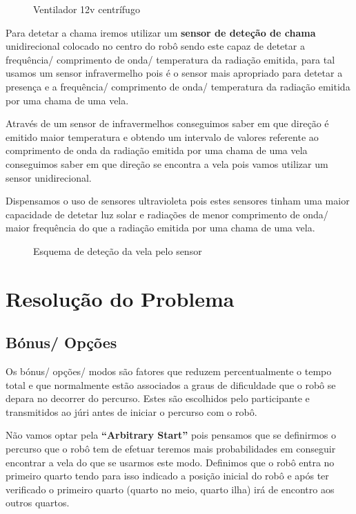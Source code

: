 \documentclass[pdftex,12pt,a4paper]{report}
\begin{document}
\begin{figure}[h]
\centerline{}
\caption{Ventilador 12v centrífugo \cite{Ventilador:28122012}}\label{ventilador}
\end{figure}
	
\clearpage

	Para detetar a chama iremos utilizar um \textbf{sensor de deteção de chama} unidirecional colocado no centro do robô sendo este capaz de detetar a frequência/ comprimento de onda/ temperatura da radiação emitida, para tal usamos um sensor infravermelho pois é o sensor mais apropriado para detetar a presença e a frequência/ comprimento de onda/ temperatura da radiação emitida por uma chama de uma vela. 
	
	Através de um sensor de infravermelhos conseguimos saber em que direção é emitido maior temperatura e obtendo um intervalo de valores referente ao comprimento de onda da radiação emitida por uma chama de uma vela conseguimos saber em que direção se encontra a vela pois vamos utilizar um sensor unidirecional.
	
	Dispensamos o uso de sensores ultravioleta pois estes sensores tinham uma maior capacidade de detetar luz solar e radiações de menor comprimento de onda/ maior frequência do que a radiação emitida por uma chama de uma vela.

\begin{figure}[h]
\centerline{}
\caption{Esquema de deteção da vela pelo sensor}\label{esquemasensor}
\end{figure}


\clearpage
\section{Resolução do Problema}

\subsection{Bónus/ Opções}

	Os bónus/ opções/ modos são fatores que reduzem percentualmente o tempo total e que normalmente estão associados a graus de dificuldade que o robô se depara no decorrer do percurso. Estes são escolhidos pelo participante e transmitidos ao júri antes de iniciar o percurso com o robô.
	
	Não vamos optar pela \textbf{“Arbitrary Start”} pois pensamos que se definirmos o percurso que o robô tem de efetuar teremos mais probabilidades em conseguir encontrar a vela do que se usarmos este modo. Definimos que o robô entra no primeiro quarto tendo para isso indicado a posição inicial do robô e após ter verificado o primeiro quarto (quarto no meio, quarto ilha) irá de encontro aos outros quartos.
	
\end{document}
